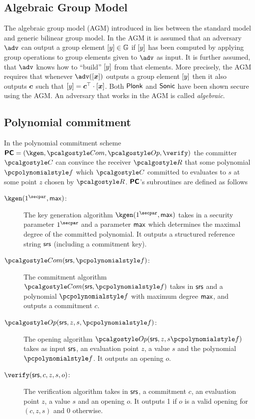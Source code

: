 \documentclass[runningheads,11pt]{llncs}
\let\spvec\vec
\let\vec\accentvec
\let\spvec\vec
\let\vec\spvec
\def\vec#1{\mathchoice{\mbox{\boldmath$\displaystyle#1$}}
  {\mbox{\boldmath$\textstyle#1$}} {\mbox{\boldmath$\scriptstyle#1$}}
  {\mbox{\boldmath$\scriptscriptstyle#1$}}}
\begin{document}
\subsection{Algebraic Group Model}
The algebraic group model (AGM) introduced in \cite{C:FucKilLos18} lies between
the standard model and generic bilinear group model. In the AGM it is assumed
that an adversary $\adv$ can output a group element $\left[y\right] \in \mathbb{G}$ if
$\left[y\right]$ has been computed by applying group operations to group elements
given to $\adv$ as input. It is further assumed, that $\adv$ knows how to
``build'' $\left[y\right]$ from that elements. More precisely, the AGM requires that
whenever $\adv(\gnone{\vec{x}})$ outputs a group element $\left[y\right]$ then it
also outputs $\vec{c}$ such that $\gnone{y} = \vec{c}^\top \cdot
\gnone{\vec{x}}$. Both $\textnormal{\textsf{Plonk}}$ and ${\textnormal{\textsf{Sonic}}}$ have been shown secure using the
AGM. An adversary that works in the AGM is called \emph{algebraic}.

\subsection{Polynomial commitment}
\label{sec:poly_com}
In the polynomial commitment scheme $\PCOM = (\kgen, \com, \open, \verify)$ the
committer $\committer$ can convince the receiver $\receiver$ that some
polynomial $\p{f}$ which $\committer$ committed to evaluates to $s$ at some
point $z$ chosen by $\receiver$. $\bm{\mathsf{PC}}$'s subroutines are defined as follows 
\begin{description}
\item[$\kgen(1^\secpar, \maxdeg)$:] The key generation algorithm
  $\kgen(1^\secpar, \maxdeg)$ takes in a security parameter $1^\secpar$ and a
  parameter $\mathsf{max}$ which determines the maximal degree of the committed
  polynomial. It outputs a structured reference string $\mathsf{srs}$ (including a
  commitment key).
\item[$\com(\srs, \p{f})$:] The commitment algorithm $\com(\srs, \p{f})$ takes
  in $\mathsf{srs}$ and a polynomial $\p{f}$ with maximum degree $\mathsf{max}$, and outputs
  a commitment $c$.
\item[$\open(\srs, z, s, \p{f})$:] The opening algorithm
  $\open(\srs, z, s \p{f})$ takes as input $\mathsf{srs}$, an evaluation point $z$, a
  value $s$ and the polynomial $\p{f}$. It outputs an opening $o$.
\item[$\verify(\srs, c, z, s, o)$:] The verification algorithm takes in $\mathsf{srs}$,
  a commitment $c$, an evaluation point $z$, a value $s$ and an opening $o$. It
  outputs 1 if $o$ is a valid opening for $(c, z, s)$ and 0 otherwise.
\end{description}
\end{document}
